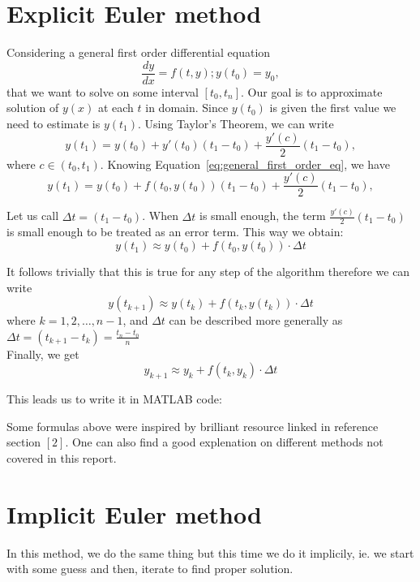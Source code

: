 \documentclass[11pt]{article}
\begin{document}
\newpage
\section{Explicit Euler method}
Considering a general first order differential equation
\begin{equation}
    \frac{dy}{dx} = f(t,y); y(t_0) = y_0,
    \label{eq:general_first_order_eq}
\end{equation}
that we want to solve on some interval $[t_0, t_n]$. 
Our goal is to approximate solution of $y(x)$ at each $t$ in domain.
Since $y(t_0)$ is given the first value we need to estimate is $y(t_1)$.
Using Taylor's Theorem, we can write 
$$y(t_1) = y(t_0) + y'(t_0)(t_1 - t_0) + \frac{y'(c)}{2}(t_1-t_0),$$
where $c \in (t_0,t_1)$. Knowing Equation~\ref{eq:general_first_order_eq}, we have
$$y(t_1) = y(t_0) + f(t_0, y(t_0))(t_1-t_0) + \frac{y'(c)}{2}(t_1-t_0),$$

Let us call $\Delta t = (t_1 - t_0)$. When $\Delta t$ is small enough, the term $\frac{y'(c)}{2}(t_1-t_0)$ is small enough to be treated as an error term.
This way we obtain:
\begin{equation}
    y(t_1) \approx y(t_0) + f(t_0, y(t_0))\cdot \Delta t
    \label{eq:euler_formula_particular}
\end{equation}

It follows trivially that this is true for any step of the algorithm therefore we can write
\begin{equation}
    y(t_{k+1}) \approx y(t_k) + f(t_k, y(t_k))\cdot \Delta t
    \label{eq:euler_formula_general}
\end{equation}
where $k = 1,2,\dots,n-1$, and $\Delta t$ can be described more
generally as $\Delta t = (t_{k+1} - t_k) = \frac{t_n-t_0}{n}$ \\
Finally, we get 
\begin{equation}
    y_{k+1} \approx y_k + f(t_k, y_k)\cdot \Delta t
    \label{eq:euler_formula_final}
\end{equation}

This leads us to write it in MATLAB code:


Some formulas above were inspired by brilliant resource linked in reference section $[2]$. 
One can also find a good explenation on different methods not covered in this report.

\section{Implicit Euler method}
In this method, we do the same thing but this time we do it implicily, ie. we
start with some guess and then, iterate to find proper solution.
\end{document}
